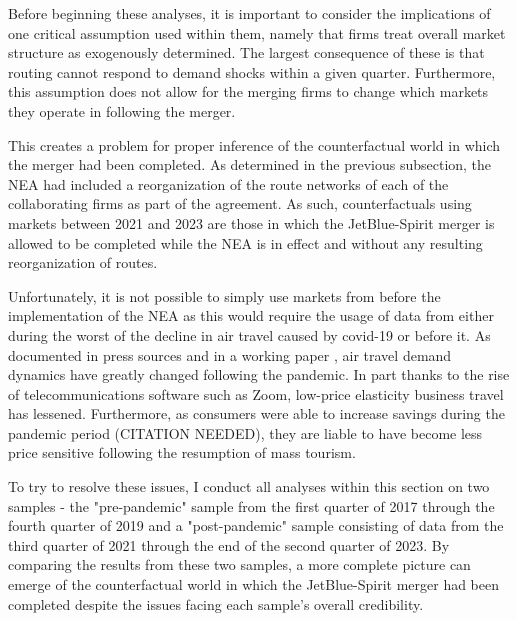 \documentclass{article}
\begin{document}
	Before beginning these analyses, it is important to consider the implications of one critical assumption used within them, namely that firms treat overall market structure as exogenously determined. The largest consequence of these is that routing cannot respond to demand shocks within a given quarter. Furthermore, this assumption does not allow for the merging firms to change which markets they operate in following the merger.
	
	This creates a problem for proper inference of the counterfactual world in which the merger had been completed. As determined in the previous subsection, the NEA had included a reorganization of the route networks of each of the collaborating firms as part of the agreement. As such, counterfactuals using markets between 2021 and 2023 are those in which the JetBlue-Spirit merger is allowed to be completed while the NEA is in effect and without any resulting reorganization of routes. 
	
	Unfortunately, it is not possible to simply use markets from before the implementation of the NEA as this would require the usage of data from either during the worst of the decline in air travel caused by covid-19 or before it. As documented in press sources and in a working paper \citep{ewen_zoom_2023}, air travel demand dynamics have greatly changed following the pandemic. In part thanks to the rise of telecommunications software such as Zoom, low-price elasticity business travel has lessened. Furthermore, as consumers were able to increase savings during the pandemic period (CITATION NEEDED), they are liable to have become less price sensitive following the resumption of mass tourism. 
	
 	To try to resolve these issues, I conduct all analyses within this section on two samples - the "pre-pandemic" sample from the first quarter of 2017 through the fourth quarter of  2019 and a "post-pandemic" sample consisting of data from the third quarter of 2021 through the end of the second quarter of 2023. By comparing the results from these two samples, a more complete picture can emerge of the counterfactual world in which the JetBlue-Spirit merger had been completed despite the issues facing each sample's overall credibility.  
 	 	 
\end{document}

